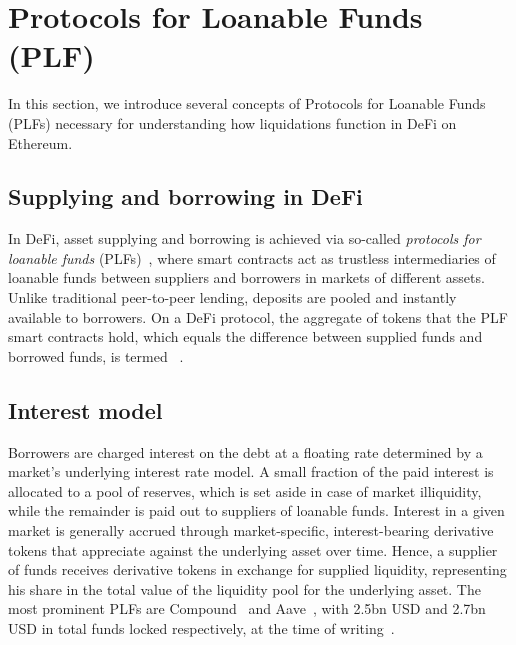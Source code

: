 \section{Protocols for Loanable Funds (PLF)}
\label{sec:plfs}
In this section, we introduce several concepts of Protocols for Loanable Funds (PLFs) necessary for understanding how liquidations function in DeFi on Ethereum.

\subsection{Supplying and borrowing in DeFi}
In DeFi, asset supplying and borrowing is achieved via so-called \textit{protocols for loanable funds} (PLFs)~\cite{gudgeon2020defi}, where smart contracts act as trustless intermediaries of loanable funds between suppliers and borrowers in markets of different assets.
Unlike traditional peer-to-peer lending, deposits are pooled and instantly available to borrowers.
On a DeFi protocol, the aggregate of tokens that the PLF smart contracts hold, which equals the difference between supplied funds and borrowed funds, is termed ~\cite{DeFiPulse2020}.

\subsection{Interest model}
Borrowers are charged interest on the debt at a floating rate determined by a market's underlying interest rate model.
A small fraction of the paid interest is allocated to a pool of reserves, which is set aside in case of market illiquidity, while the remainder is paid out to suppliers of loanable funds.
Interest in a given market is generally accrued through market-specific, interest-bearing derivative tokens that appreciate against the underlying asset over time.
Hence, a supplier of funds receives derivative tokens in exchange for supplied liquidity, representing his share in the total value of the liquidity pool for the underlying asset.
The most prominent PLFs are Compound~\cite{web:compoundfinance} and Aave~\cite{web:aave}, with 2.5bn USD and 2.7bn USD in total funds locked respectively, at the time of writing~\cite{DeFiPulse2020}.

